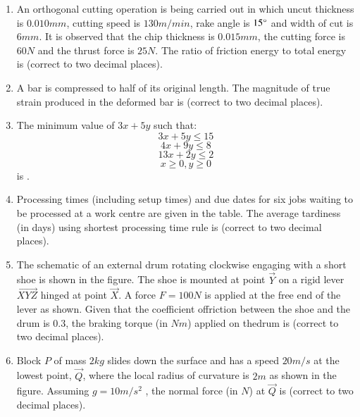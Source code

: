 \documentclass[journal]{IEEEtran}
\begin{document}
\begin{enumerate}
    \item An orthogonal cutting operation is being carried out in which uncut thickness is $0.010 mm$, cutting speed is $130 m/min$, rake angle is $15\degree$ and width of cut is $6 mm$. It is observed that the chip thickness is $0.015 mm$, the cutting force is $60 N$ and the thrust force is $25 N$. The ratio of friction energy to total energy is \underline{\hspace{1cm}} (correct to two decimal places). 

    \item A bar is compressed to half of its original length. The magnitude of true strain produced in the deformed bar is \underline{\hspace{1cm}} (correct to two decimal places).

    \item The minimum value of $3x+5y$ such that:
        $$3x+5y\leq15$$
        $$4x+9y\leq8$$
        $$13x+2y\leq2$$
        $$x\geq0,y\geq0$$
        is \underline{\hspace{1cm}}.

    \item Processing times (including setup times) and due dates for six jobs waiting to be processed at a work centre are given in the table. The average tardiness (in days) using shortest processing time rule is \underline{\hspace{1cm}} (correct to two decimal places).
        \begin{table}[!ht]
            \centering
            
        \end{table}

    \item The schematic of an external drum rotating clockwise engaging with a short shoe is shown in the figure. The shoe is mounted at point $\vec{Y}$ on a rigid lever $\vec{XYZ}$ hinged at point $\vec{X}$. A force $F = 100 N$ is applied at the free end of the lever as shown. Given that the coefficient offriction between the shoe and the drum is $0.3$, the braking torque (in $Nm$) applied on thedrum is \underline{\hspace{1cm}} (correct to two decimal places).
        \begin{figure}[!ht]
            \centering
            
        \end{figure}

    \item Block $P$ of mass $2 kg$ slides down the surface and has a speed $20 m/s$ at the lowest point, $\vec{Q}$, where the local radius of curvature is $2 m$ as shown in the figure. Assuming $g = 10 m/s^2$  , the normal force (in $N$) at $\vec{Q}$ is \underline{\hspace{1cm}} (correct to two decimal places).
        \begin{figure}[!ht]
            \centering
            
        \end{figure}


\end{enumerate}
\end{document}
